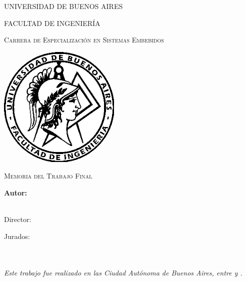 \documentclass[
11pt, %
spanish,
singlespacing, %
parskip, %
headsepline, %
]{MastersDoctoralThesis} %
\author{Ing. Hernán Darío Ferreyra} %
\begin{document}
\frontmatter %

\pagestyle{plain} %


\begin{titlepage}
\begin{center}

{\scshape\LARGE UNIVERSIDAD DE BUENOS AIRES\par}\vspace{0.1cm} %
{\scshape\LARGE FACULTAD DE INGENIERÍA\par}\vspace{0.1cm} %
{\scshape\LARGE Carrera de Especialización en Sistemas Embebidos\par}\vspace{1cm} %

\includegraphics[width=.3\textwidth]{./Figures/logoFIUBA.png}
\vspace{1cm}

\textsc{\Large Memoria del Trabajo Final}\\[0.5cm] %

{\huge \bfseries \ttitle\par}\vspace{0.4cm} %

\vspace{1cm}
\LARGE\textbf{Autor:\\
\authorname}\\ %

\vspace{1cm}

\large
\vspace{10px}
{Director:} \\
{\supname} %
 
\vspace{1cm}
Jurados:\\
\jurunoname\\
\jurdosname\\
\jurtresname
 
\vfill
\textit{Este trabajo fue realizado en las Ciudad Autónoma de Buenos Aires, entre \fechaINICIOname \hspace{1px} y \fechaFINALname.}
\end{center}
\end{titlepage}
\end{document}
